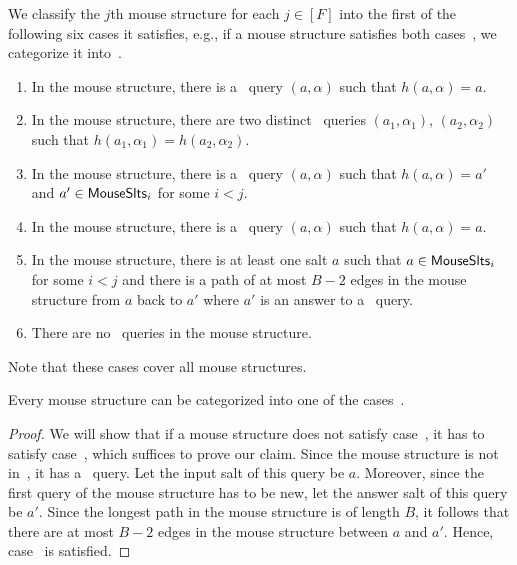 We classify the $j$th mouse structure for each $j\in[F]$ into the first of the following six cases it satisfies, e.g., if a mouse structure satisfies both cases~, we categorize it into~. 
\begin{enumerate}
\item \label{case:newsl}In the mouse structure, there is a \new\ query $(a,\alpha)$ such that $h(a,\alpha)=a$.
\item \label{case:newcol}In the mouse structure, there are two distinct \new\ queries $(a_1,\alpha_1)$, $(a_2,\alpha_2)$ such that $h(a_1,\alpha_1)=h(a_2,\alpha_2)$.
\item \label{case:repnew}In the mouse structure, there is a \new\ query $(a,\alpha)$ such that $h(a,\alpha)=a'$ and $a'\in \mathsf{MouseSlts}_i$ for some $i<j$. 
\item \label{case:oldsl}In the mouse structure, there is a \urep\ query $(a,\alpha)$ such that $h(a,\alpha)=a$. 
\item \label{case:somerep}In the mouse structure, there is at least one salt $a$ such that $a\in \mathsf{MouseSlts}_i$ for some $i<j$ and there is a path of at most $B-2$ edges in the mouse structure from $a$ back to $a'$ where $a'$ is an answer to a \new\ query.
\item \label{case:norep}There are no \frep\ queries in the mouse structure.
\end{enumerate}
Note that these cases cover all mouse structures.
\begin{myclaim}
  Every mouse structure can be categorized into one of the cases~.
\end{myclaim}
\begin{proof}
  We will show that if a mouse structure does not satisfy case~, it has to satisfy case~, which suffices to prove our claim. Since the mouse structure is not in~, it has a \frep\ query. Let the input salt of this query be $a$. Moreover, since the first query of the mouse structure has to be new, let the answer salt of this query be $a'$. Since the longest path in the mouse structure is of length $B$, it follows that there are at most $B-2$ edges in the mouse structure between $a$ and $a'$. Hence, case~ is satisfied.
\end{proof}

